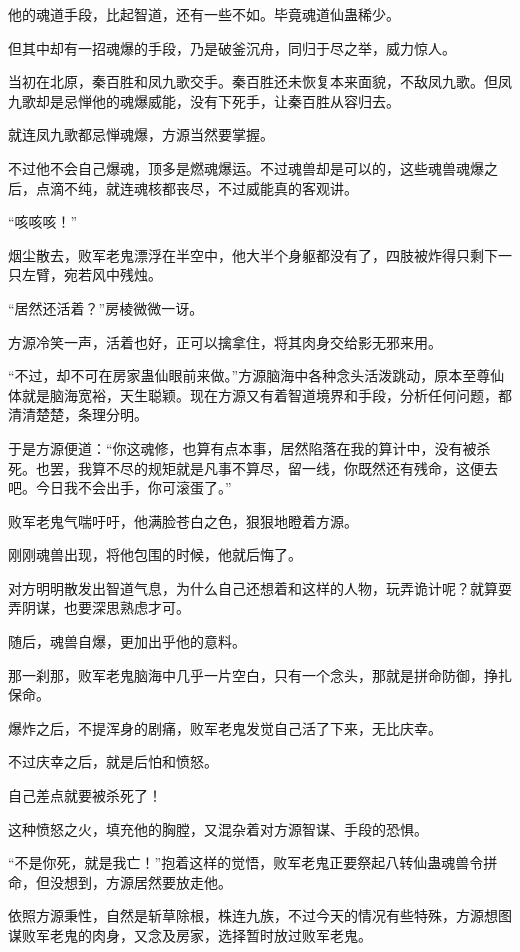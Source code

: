 \begin{this_body}
他的魂道手段，比起智道，还有一些不如。毕竟魂道仙蛊稀少。

但其中却有一招魂爆的手段，乃是破釜沉舟，同归于尽之举，威力惊人。

当初在北原，秦百胜和凤九歌交手。秦百胜还未恢复本来面貌，不敌凤九歌。但凤九歌却是忌惮他的魂爆威能，没有下死手，让秦百胜从容归去。

就连凤九歌都忌惮魂爆，方源当然要掌握。

不过他不会自己爆魂，顶多是燃魂爆运。不过魂兽却是可以的，这些魂兽魂爆之后，点滴不纯，就连魂核都丧尽，不过威能真的客观讲。

“咳咳咳！”

烟尘散去，败军老鬼漂浮在半空中，他大半个身躯都没有了，四肢被炸得只剩下一只左臂，宛若风中残烛。

“居然还活着？”房棱微微一讶。

方源冷笑一声，活着也好，正可以擒拿住，将其肉身交给影无邪来用。

“不过，却不可在房家蛊仙眼前来做。”方源脑海中各种念头活泼跳动，原本至尊仙体就是脑海宽裕，天生聪颖。现在方源又有着智道境界和手段，分析任何问题，都清清楚楚，条理分明。

于是方源便道：“你这魂修，也算有点本事，居然陷落在我的算计中，没有被杀死。也罢，我算不尽的规矩就是凡事不算尽，留一线，你既然还有残命，这便去吧。今日我不会出手，你可滚蛋了。”

败军老鬼气喘吁吁，他满脸苍白之色，狠狠地瞪着方源。

刚刚魂兽出现，将他包围的时候，他就后悔了。

对方明明散发出智道气息，为什么自己还想着和这样的人物，玩弄诡计呢？就算耍弄阴谋，也要深思熟虑才可。

随后，魂兽自爆，更加出乎他的意料。

那一刹那，败军老鬼脑海中几乎一片空白，只有一个念头，那就是拼命防御，挣扎保命。

爆炸之后，不提浑身的剧痛，败军老鬼发觉自己活了下来，无比庆幸。

不过庆幸之后，就是后怕和愤怒。

自己差点就要被杀死了！

这种愤怒之火，填充他的胸膛，又混杂着对方源智谋、手段的恐惧。

“不是你死，就是我亡！”抱着这样的觉悟，败军老鬼正要祭起八转仙蛊魂兽令拼命，但没想到，方源居然要放走他。

依照方源秉性，自然是斩草除根，株连九族，不过今天的情况有些特殊，方源想图谋败军老鬼的肉身，又念及房家，选择暂时放过败军老鬼。


\end{this_body}
